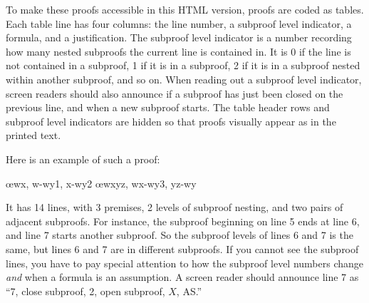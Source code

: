 To make these proofs accessible in this HTML version, proofs are coded
as tables. Each table line has four columns: the line number, a
subproof level indicator, a formula, and a justification. The subproof
level indicator is a number recording how many nested subproofs the
current line is contained in. It is 0 if the line is not contained in
a subproof, 1 if it is in a subproof, 2 if it is in a subproof nested
within another subproof, and so on. When reading out a subproof level
indicator, screen readers should also announce if a subproof has just
been closed on the previous line, and when a new subproof starts. The
table header rows and subproof level indicators are hidden so that
proofs visually appear as in the printed text.

Here is an example of such a proof:
\begin{fitchproof}
\PR
{}\PR
{}\PR
\open
	\AS
	\open
		\AS
	\close
	\open
		\AS
	\close
	\oe{wx, w-wy1, x-wy2}
\close
\open
	\AS
\close
{}\oe{wxyz, wx-wy3, yz-wy}
\end{fitchproof}
It has 14 lines, with 3 premises, 2 levels of subproof nesting, and
two pairs of adjacent subproofs. For instance, the subproof beginning
on line 5 ends at line 6, and line 7 starts another subproof. So the
subproof levels of lines 6 and 7 is the same, but lines 6 and 7 are in
different subproofs. If you cannot see the subproof lines, you have to
pay special attention to how the subproof level numbers change
\emph{and} when a formula is an assumption. A screen reader should
announce line 7 as ``7, close subproof, 2, open subproof, $X$,
AS.''